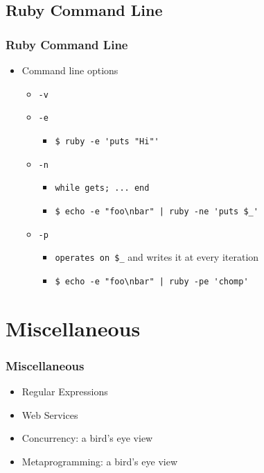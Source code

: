 \subsection{Ruby Command Line}
\begin{frame}[fragile]\frametitle{Ruby Command Line}

\begin{itemize}

\item Command line options

\begin{itemize}
\item \texttt{-v}
\pause
\item \texttt{-e}
\begin{itemize}
\item \lstinline!$ ruby -e 'puts "Hi"'!
\end{itemize}
\pause
\item \texttt{-n}
\begin{itemize}
\item \texttt{while gets; ... end}
\item \lstinline!$ echo -e "foo\nbar" | ruby -ne 'puts $_'!
\end{itemize}
\pause
\item \texttt{-p}
\begin{itemize}
\item \texttt{operates on \texttt{\$\_}} and writes it at every iteration
\item \lstinline!$ echo -e "foo\nbar" | ruby -pe 'chomp'!
\end{itemize}

\end{itemize}

\end{itemize}

\end{frame}






\section{Miscellaneous} 
\begin{frame}\frametitle{Miscellaneous} 
\begin{itemize}
\item Regular Expressions
\item Web Services
\item Concurrency: a bird's eye view
\item Metaprogramming: a bird's eye view
\end{itemize}
\end{frame}




